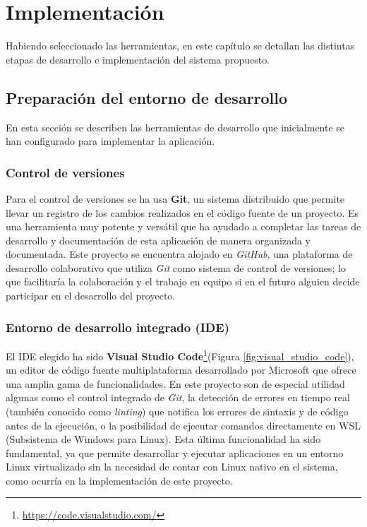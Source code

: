 \chapter{Implementación}
Habiendo seleccionado las herramientas, en este capítulo se detallan las distintas etapas de desarrollo e implementación del sistema propuesto.


\section{Preparación del entorno de desarrollo}
En esta sección se describen las herramientas de desarrollo que inicialmente se han configurado para implementar la aplicación.

\subsection{Control de versiones}
Para el control de versiones se ha usa \textbf{Git}, un sistema distribuido que permite llevar un registro de los cambios realizados en el código fuente de un proyecto. Es una herramienta muy potente y versátil que ha ayudado a completar las tareas de desarrollo y documentación de esta aplicación de manera organizada y documentada. Este proyecto se encuentra alojado en \textit{GitHub}, una plataforma de desarrollo colaborativo que utiliza \textit{Git} como sistema de control de versiones; lo que facilitaría la colaboración y el trabajo en equipo si en el futuro alguien decide participar en el desarrollo del proyecto.

\subsection{Entorno de desarrollo integrado (IDE)}
El IDE elegido ha sido \textbf{Visual Studio Code}\footnote{\url{https://code.visualstudio.com/}}(Figura \ref{fig:visual_studio_code}), un editor de código fuente multiplataforma desarrollado por Microsoft que ofrece una amplia gama de funcionalidades. En este proyecto son de especial utilidad algunas como el control integrado de \textit{Git}, la detección de errores en tiempo real (también conocido como \textit{linting}) que notifica los errores de sintaxis y de código antes de la ejecución, o la posibilidad de ejecutar comandos directamente en WSL (Subsistema de Windows para Linux). Esta última funcionalidad ha sido fundamental, ya que permite desarrollar y ejecutar aplicaciones en un entorno Linux virtualizado sin la necesidad de contar con Linux nativo en el sistema, como ocurría en la implementación de este proyecto.

